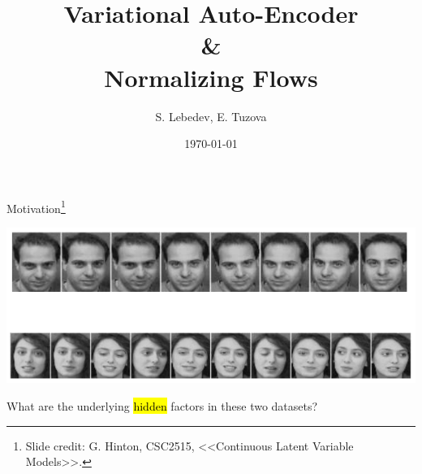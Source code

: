 \documentclass[unicode,11pt]{beamer}
\title{Variational Auto-Encoder \\
  \& \\
  Normalizing Flows}
\author{S. Lebedev, E. Tuzova}
\date{\today}
\begin{document}
\begin{frame}
  \maketitle
\end{frame}


\begin{frame}{Motivation\footnote{Slide credit: G. Hinton, CSC2515, <<Continuous
      Latent Variable Models>>.}}
  \begin{center}
    \includegraphics[width=.8\textwidth]{images/motivation}
  \end{center}

  What are the underlying \hl{hidden} factors in these two datasets?
\end{frame}
\end{document}
